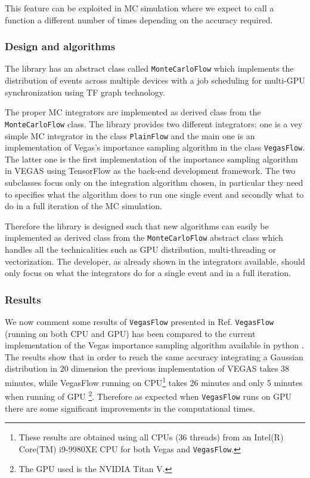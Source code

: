 \documentclass[../main/main.tex]{subfiles}
\begin{document}
This feature can be exploited in MC simulation where we expect to call a function a different number of times depending on the accuracy required. 

\subsubsection{Design and algorithms}
The library has an abstract class called \texttt{MonteCarloFlow} which implements the distribution
of events across multiple devices with a job scheduling for multi-GPU synchronization using TF graph technology.

The proper MC integrators are implemented as derived class from the \texttt{MonteCarloFlow} class. The library provides two different integrators: one is a vey simple MC integrator in the class \texttt{PlainFlow} and the main one is an implementation of Vegas's importance sampling algorithm in the class \texttt{VegasFlow}.
The latter one is the first implementation of the importance sampling algorithm in VEGAS using TensorFlow as the back-end development framework.
The two subclasses focus only on the integration algorithm chosen, in particular they need to specifies what the algorithm does to run one single event and secondly what to do in a full iteration of the MC simulation.

Therefore the library is designed such that new algorithms can easily be implemented as derived class from the \texttt{MonteCarloFlow} abstract class which handles all the technicalities such as GPU distribution, multi-threading or vectorization.
The developer, as already shown in the integrators available, should only focus on what the integrators do for a single event and in a full iteration.

 
 \subsubsection{Results}
We now comment some results of \texttt{VegasFlow} presented in Ref\cite{Carrazza:2020rdn}.
\texttt{VegasFlow} (running on both CPU and GPU) has been compared to the current implementation of the Vegas importance sampling algorithm available in python \cite{peter_lepage_2021_4746454}. The results show that in order to reach the same accuracy integrating a Gaussian distribution in 20 dimension the previous implementation of VEGAS takes  38 minutes, while VegasFlow running on CPU\footnote{These results are obtained using all CPUs (36 threads) from an Intel(R) Core(TM) i9-9980XE CPU for both Vegas and \texttt{VegasFlow}.} takes 26 minutes and only 5 minutes when running of GPU \footnote{The GPU used is the NVIDIA Titan V.}.
Therefore as expected when \texttt{VegasFlow} runs on GPU there are some significant improvements in the computational times.
\end{document}
